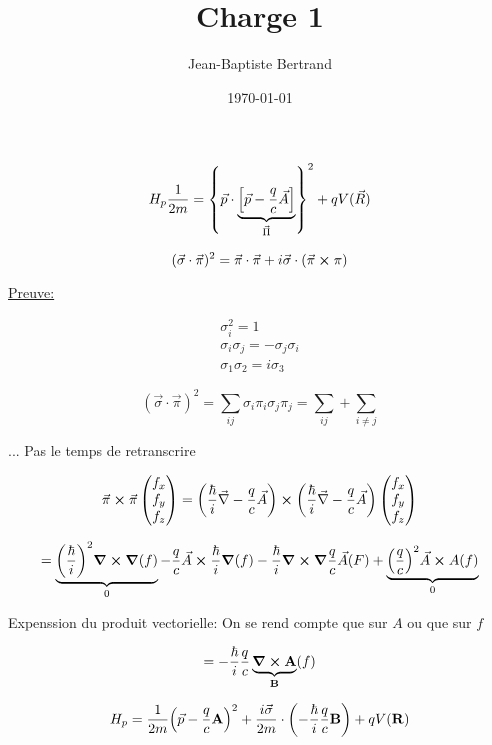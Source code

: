 \documentclass{article}
\title{Charge 1}
\author{Jean-Baptiste Bertrand}
\date{\today}
\begin{document}
\maketitle

$$H_p \frac{1}{2m} = \qty{\vec p \cdot \underbrace{\qty[\vec p - \frac qc \vec A]}_{\vec \Pi}}^2 +qV(\vec R)$$


$$(\vec \sigma \cdot \vec \pi)^2 = \vec \pi \cdot \vec \pi + i\vec\sigma\cdot(\vec\pi\cross\pi)$$

\underline{Preuve:}

$$\boxed{\begin{matrix}\sigma_i^2 = 1\\ \sigma_i\sigma_j =-\sigma_j\sigma_i\\\sigma_1\sigma_2 = i\sigma_3 \end{matrix}}$$


$$(\vec\sigma \cdot \vec \pi)^2 = \sum_{ij}\sigma_i\pi_i\sigma_j\pi_j = \sum_{ij} + \sum_{i\neq j}$$


... Pas le temps de retranscrire

$$\vec \pi \cross \vec \pi \begin{pmatrix}
	f_x\\f_y\\f_z
\end{pmatrix} =  \qty(\frac\hbar i \vec \nabla -\frac q c \vec A) \cross \qty(\frac\hbar i \vec \nabla -\frac q c \vec A)\begin{pmatrix}
	f_x\\f_y\\f_z
\end{pmatrix} $$


$$=\underbrace{\qty(\frac \hbar i)^2 \grad \cross \grad(f)}_{0} - \frac q c \vec A \cross \frac \hbar i \grad (f) - \frac \hbar i \grad \cross \grad \frac qc \vec A(F) + \underbrace{\qty(\frac qc )^2 \vec A \cross A (f)}_0$$

Expenssion du produit vectorielle: On se rend compte que sur $A$ ou que sur $f$


$$= -\frac \hbar i \frac qc \underbrace{\grad \cross \vb A}_{\vb B}(f)$$


$$H_p = \frac{1}{2m} \qty(\vec p -\frac qc \vb A)^2 + \frac{i\vec\sigma}{2m}\cdot\qty(-\frac \hbar i \frac qc \vb B) + q V(\vb R)$$
\end{document}
